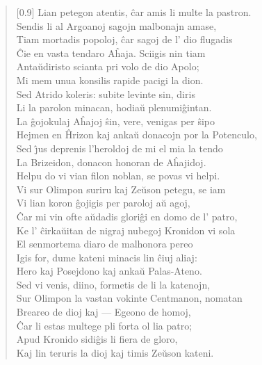\begin{verse}[0.9\textwidth]
          Lian petegon atentis, \^car amis li multe la pastron.\\
          Sendis li al Argoanoj sagojn malbonajn amase,\\
          Tiam mortadis popoloj, \^car sagoj de l' dio flugadis\\
          \^Cie en vasta tendaro A\^haja. Sciigis nin tiam\\
          Anta\u udiristo scianta pri volo de dio Apolo;\\
          Mi mem unua konsilis rapide pacigi la dion.\\
          Sed Atrido koleris: subite levinte sin, diris\\
          Li la parolon minacan, hodia\u u plenumi\^gintan.\\
          La \^gojokulaj A\^hajoj \^sin, vere, venigas per \^sipo\\
          Hejmen en \^Hrizon kaj anka\u u donacojn por la Potenculo,\\
          Sed \^{\j}us deprenis l'heroldoj de mi el mia la tendo\\
          La Brizeidon, donacon honoran de A\^hajidoj.\\
          Helpu do vi vian filon noblan, se povas vi helpi.\\
          Vi sur Olimpon suriru kaj Ze\u uson petegu, se iam\\
          Vi lian koron \^gojigis per paroloj a\u u agoj,\\
          \^Car mi vin ofte a\u udadis glori\^gi en domo de l' patro,\\
          Ke l' \^cirka\u uitan de nigraj nubegoj Kronidon vi sola\\
          El senmortema diaro de malhonora pereo\\
          Igis for, dume kateni minacis lin \^ciuj aliaj:\\
          Hero kaj Posejdono kaj anka\u u Palas-Ateno.\\
          Sed vi venis, diino, formetis de li la katenojn,\\
          Sur Olimpon la vastan vokinte Centmanon, nomatan\\
          Breareo de dioj kaj --- Egeono de homoj,\\
          \^Car li estas multege pli forta ol lia patro;\\
          Apud Kronido sidi\^gis li fiera de gloro,\\
          Kaj lin teruris la dioj kaj timis Ze\u uson kateni.\\

\end{verse}
